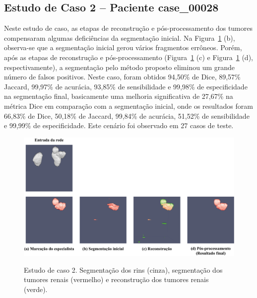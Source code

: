 \subsection{Estudo de Caso 2 – Paciente case\_00028}
\label{sec:estudo-tumores-caso-2}

Neste estudo de caso, as etapas de reconstrução e pós-processamento dos tumores compensaram algumas deficiências da segmentação inicial. Na Figura~\ref{fig:estudo-tumores-2} (b), observa-se que a segmentação inicial gerou vários fragmentos errôneos. Porém, após as etapas de reconstrução e pós-processamento (Figura~\ref{fig:estudo-tumores-2} (c) e Figura~\ref{fig:estudo-tumores-2} (d), respectivamente), a segmentação pelo método proposto eliminou um grande número de falsos positivos. Neste caso, foram obtidos 94,50\% de Dice, 89,57\% Jaccard, 99,97\% de acurácia, 93,85\% de sensibilidade e 99,98\% de especificidade na segmentação final, basicamente uma melhoria significativa de 27,67\% na métrica Dice em comparação com a segmentação inicial, onde os resultados foram 66,83\% de Dice, 50,18\% de Jaccard, 99,84\% de acurácia, 51,52\% de sensibilidade e 99,99\% de especificidade. Este cenário foi observado em 27 casos de teste.

\begin{figure}[!ht]
    \centering
    \caption{Estudo de caso 2. Segmentação dos rins (cinza), segmentação dos tumores renais (vermelho) e reconstrução dos tumores renais (verde).}
    \includegraphics[width=1\textwidth]{figuras/estudos-casos-tumores-renais-2-28.pdf}
    \label{fig:estudo-tumores-2}
\end{figure}


